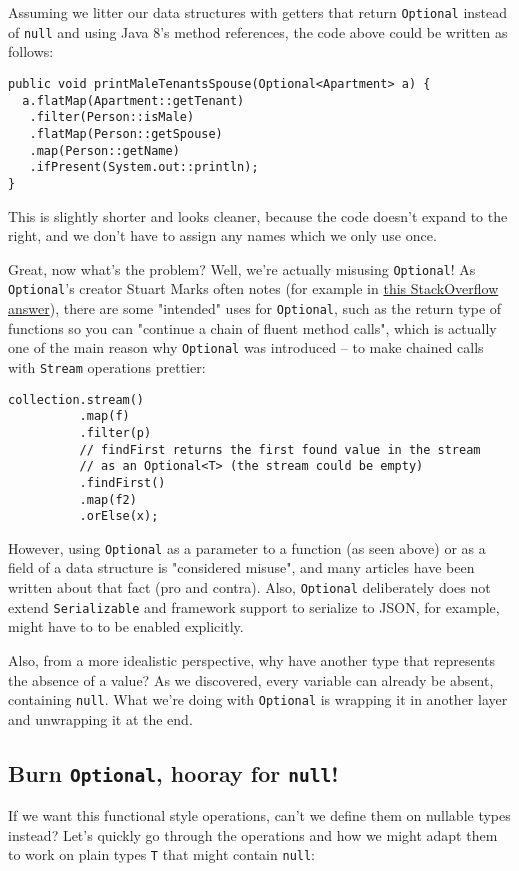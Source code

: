 \documentclass[11pt]{article}
\begin{document}
Assuming we litter our data structures with getters that return \texttt{Optional} instead of \texttt{null} and using Java 8's method references, the code above could be written as follows:

\begin{verbatim}
public void printMaleTenantsSpouse(Optional<Apartment> a) {
  a.flatMap(Apartment::getTenant)
   .filter(Person::isMale)
   .flatMap(Person::getSpouse)
   .map(Person::getName)
   .ifPresent(System.out::println);
}
\end{verbatim}

This is slightly shorter and looks cleaner, because the code doesn't expand to the right, and we don't have to assign any names which we only use once.

Great, now what's the problem? Well, we're actually misusing \texttt{Optional}! As \texttt{Optional}'s creator Stuart Marks often notes (for example in \href{http://stackoverflow.com/questions/23454952/uses-for-java8-optional/23464794#23464794}{this StackOverflow answer}), there are some "intended" uses for \texttt{Optional}, such as the return type of functions so you can "continue a chain of fluent method calls", which is actually one of the main reason why \texttt{Optional} was introduced -- to make chained calls with \texttt{Stream} operations prettier:

\begin{verbatim}
collection.stream()
          .map(f)
          .filter(p)
          // findFirst returns the first found value in the stream 
          // as an Optional<T> (the stream could be empty)
          .findFirst()
          .map(f2)
          .orElse(x);
\end{verbatim}

However, using \texttt{Optional} as a parameter to a function (as seen above) or as a field of a data structure is "considered misuse", and many articles have been written about that fact (pro and contra). Also, \texttt{Optional} deliberately does not extend \texttt{Serializable} and framework support to serialize to JSON, for example, might have to to be enabled explicitly.

Also, from a more idealistic perspective, why have another type that represents the absence of a value? As we discovered, every variable can already be absent, containing \texttt{null}. What we're doing with \texttt{Optional} is wrapping it in another layer and unwrapping it at the end.
\subsection*{Burn \texttt{Optional}, hooray for \texttt{null}!}
\label{sec:orgheadline4}
If we want this functional style operations, can't we define them on nullable types instead? Let's quickly go through the operations and how we might adapt them to work on plain types \texttt{T} that might contain \texttt{null}:
\end{document}
